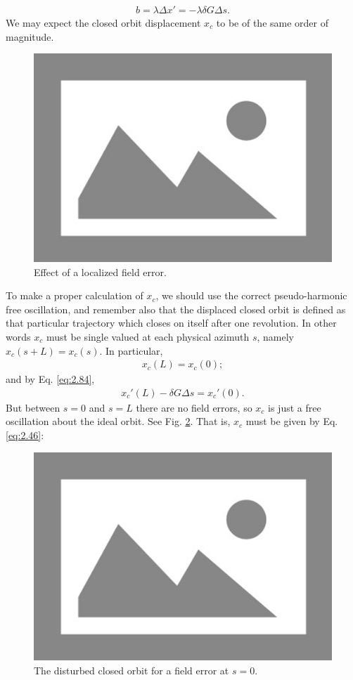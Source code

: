 \begin{align}\label{eq:2.86}
	b = \lambda \Delta x' = -\lambda \delta G \Delta s.
\end{align}
We may expect the closed orbit displacement $x_c$ to be of the same order of magnitude.
\begin{figure}[!htb]
	\centering
	\includegraphics[width=0.8\linewidth]{./Figuras/placeholder.png}
	\caption{Effect of a localized field error.}
	\label{fig:fig21}
\end{figure}
To make a proper calculation of $x_c$, we should use the correct pseudo-harmonic free oscillation, and remember also that the displaced closed orbit is defined as that particular
 trajectory which closes on itself after one revolution. In other words $x_c$ must be single valued at each physical azimuth $s$, namely $x_c(s + L) = x_c(s)$. In particular,
 \begin{align}
	x_c(L) = x_c(0);
\end{align}
and by Eq. \eqref{eq:2.84},
\begin{align}
	x_c'(L) - \delta G \Delta s = x_c'(0).
\end{align}
But between $s = 0$ and $s = L$ there are no field errors, so $x_c$ is just a free oscillation about the ideal orbit. See Fig. \ref{fig:fig22}. That is, $x_c$ must be given by Eq. \eqref{eq:2.46}:
\begin{figure}[!htb]
	\centering
	\includegraphics[width=0.8\linewidth]{./Figuras/placeholder.png}
	\caption{The disturbed closed orbit for a field error at $s = 0$.}
	\label{fig:fig22}
\end{figure}
